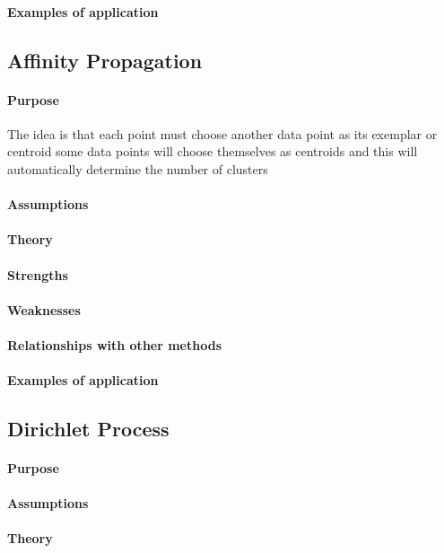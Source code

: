 \paragraph{Examples of application}

\subsection{Affinity Propagation}
\paragraph{Purpose}
The idea is that each point must choose another data point as its exemplar or centroid
some data points will choose themselves as centroids and this will automatically determine
the number of clusters 
\paragraph{Assumptions}
\paragraph{Theory}
\paragraph{Strengths}
\paragraph{Weaknesses}
\paragraph{Relationships with other methods}
\paragraph{Examples of application}

\subsection{Dirichlet Process}
\paragraph{Purpose}
\paragraph{Assumptions}
\paragraph{Theory}
